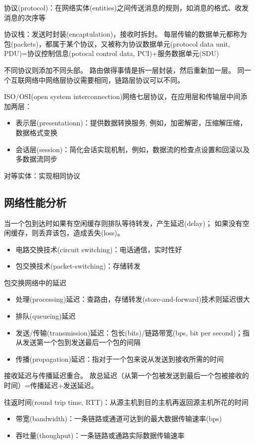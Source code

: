 协议(protocol)：在网络实体(entities)之间传送消息的规则，如消息的格式、收发消息的次序等

协议栈：发送时封装(encaptulation)，接收时拆封。
每层传输的数据单元都称为包(packets)，都属于某个协议，又被称为协议数据单元(protocol data unit, PDU)=协议控制信息(potocal control data, PCI)+服务数据单元(SDU)
\begin{center}
\end{center}
不同协议则添加不同头部。
路由做得事情是拆一层封装，然后重新加一层。
同一个互联网络中网络层协议需要相同，链路层协议可以不同。


ISO/OSI(open system interconnection)网络七层协议，在应用层和传输层中间添加两层：
\begin{itemize}
	\item 表示层(presentationn)：提供数据转换服务, 例如，加密解密，压缩解压缩，数据格式变换
	\item 会话层(session)：简化会话实现机制，例如，数据流的检查点设置和回滚以及多数据流同步
\end{itemize}

对等实体：实现相同协议

\subsection{网络性能分析}
当一个包到达时如果有空闲缓存则排队等待转发，产生延迟(delay)；
如果没有空闲缓存，则丢弃该包，造成丢失(loss)。

\begin{itemize}
	\item 电路交换技术(circuit switching)：电话通信，实时性好
	\item 包交换技术(packet-switching)：存储转发
\end{itemize}

包交换网络中的延迟
\begin{itemize}
	\item 处理(processing)延迟：查路由，存储转发(store-and-forward)技术则延迟很大
	\item 排队(queueing)延迟
	\item 发送/传输(transmission)延迟：包长(bits)/链路带宽(bps, bit per second)；指从发送第一个包到发送最后一个包的间隔
	\item 传播(propagation)延迟：指对于一个包来说从发送到接收所需的时间
\end{itemize}
接收延迟与传播延迟重合。
故总延迟（从第一个包被发送到最后一个包被接收的时间）=传播延迟+发送延迟。

往返时间(round trip time, RTT)：从源主机到目的主机再返回源主机所花的时间

\begin{itemize}
	\item 带宽(bandwidth)：一条链路或通道可达到的最大数据传输速率(bps)
	\item 吞吐量(thoughput)：一条链路或通路实际数据传输速率
\end{itemize}